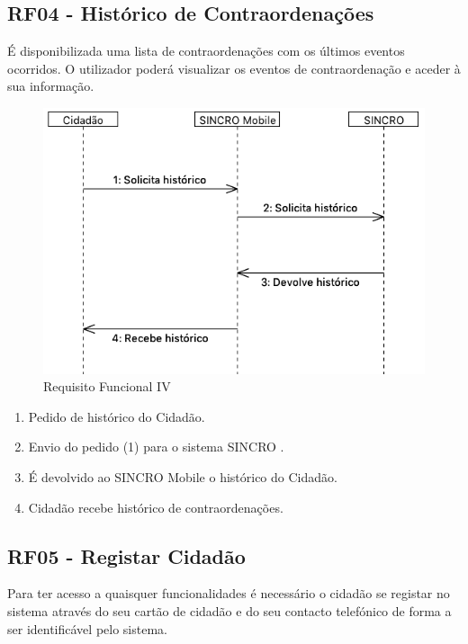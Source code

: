 \documentclass{article}
\begin{document}
\hypertarget{_rf04_hist_rico_de_contraordena_es}{%
\subsection{RF04 - Histórico de
Contraordenações}\label{_rf04_hist_rico_de_contraordena_es}}

É disponibilizada uma lista de contraordenações com os últimos eventos
ocorridos. O utilizador poderá visualizar os eventos de contraordenação
e aceder à sua informação.

\begin{figure}
\centering
\includegraphics[scale=0.3]{./adoc_images/sequence/rf04.png}
\caption{Requisito Funcional IV}
\end{figure}

\begin{enumerate}
\def\labelenumi{\arabic{enumi}.}
\item
  Pedido de histórico do Cidadão.
\item
  Envio do pedido (1) para o sistema SINCRO .
\item
  É devolvido ao SINCRO Mobile o histórico do Cidadão.
\item
  Cidadão recebe histórico de contraordenações.
\end{enumerate}

\hypertarget{_rf05_registar_cidad_o}{%
\subsection{RF05 - Registar Cidadão}\label{_rf05_registar_cidad_o}}

Para ter acesso a quaisquer funcionalidades é necessário o cidadão se
registar no sistema através do seu cartão de cidadão e do seu contacto
telefónico de forma a ser identificável pelo sistema.
\end{document}
